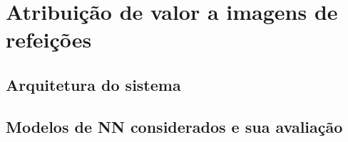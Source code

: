 \section{Atribuição de valor a imagens de refeições}

\subsection{Arquitetura do sistema}
\subsection{Modelos de NN considerados e sua avaliação}